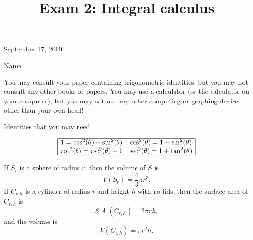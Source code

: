 \documentclass[10pt]{amsart}
\title[\hskip 0.2inExam 2\hfill Name:\hskip 2in]{Exam 2:  Integral calculus}
\begin{document}
\renewcommand{\arraystretch}{2}

\begin{figure}[h]
\centerline{
}
\end{figure}

\centerline{\Large{}}
\medskip

\maketitle

\vfill


\centerline{\LARGE{September 17, 2000}}

\vskip 1in

\hskip 2in\Large{Name:}

\vskip 1in

\noindent You may consult your paper containing trigonometric
identities, but you may not consult any other books or papers.  You
may use a calculator (or the calculator on your computer), but you may
not use any other computing or graphing device other than your own
head! 

\vfill\pagebreak


\centerline{\sc Identities that you may need}

\vskip 0.3in


$$
\begin{array}{|c|c|}
\hline
1=\cos^2(\theta)+\sin^2(\theta) & \cos^2(\theta)=1-\sin^2(\theta)\\
\hline
\cot^2(\theta)=\csc^2(\theta)-1 & \sec^2(\theta)=1+\tan^2(\theta) \\
\hline
\end{array}
$$

If $S_r$ is a sphere of radius $r$, then the volume of $S$ is
$$
V(S_r)=\frac{4}{3}\pi r^3.
$$
If $C_{r,h}$ is a cylinder of radius $r$ and height $h$ with no lids, then
the surface area of $C_{r,h}$ is
$$
S.A.(C_{r,h})=2\pi rh,
$$
and the volume is
$$
V(C_{r,h})=\pi r^2h.
$$

\vfill\pagebreak
\end{document}
